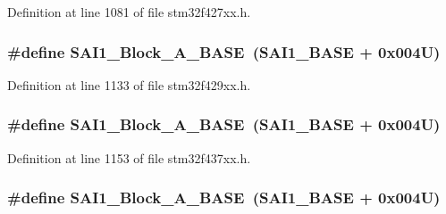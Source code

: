 Definition at line 1081 of file stm32f427xx.\+h.

\subsubsection[{\texorpdfstring{S\+A\+I1\+\_\+\+Block\+\_\+\+A\+\_\+\+B\+A\+SE}{SAI1_Block_A_BASE}}]{\setlength{\rightskip}{0pt plus 5cm}\#define S\+A\+I1\+\_\+\+Block\+\_\+\+A\+\_\+\+B\+A\+SE~({\bf S\+A\+I1\+\_\+\+B\+A\+SE} + 0x004\+U)}\hypertarget{group___peripheral__memory__map_ga31f72e5e5d7aea23bc8a5191bc32e900}{}\label{group___peripheral__memory__map_ga31f72e5e5d7aea23bc8a5191bc32e900}


Definition at line 1133 of file stm32f429xx.\+h.

\subsubsection[{\texorpdfstring{S\+A\+I1\+\_\+\+Block\+\_\+\+A\+\_\+\+B\+A\+SE}{SAI1_Block_A_BASE}}]{\setlength{\rightskip}{0pt plus 5cm}\#define S\+A\+I1\+\_\+\+Block\+\_\+\+A\+\_\+\+B\+A\+SE~({\bf S\+A\+I1\+\_\+\+B\+A\+SE} + 0x004\+U)}\hypertarget{group___peripheral__memory__map_ga31f72e5e5d7aea23bc8a5191bc32e900}{}\label{group___peripheral__memory__map_ga31f72e5e5d7aea23bc8a5191bc32e900}


Definition at line 1153 of file stm32f437xx.\+h.

\subsubsection[{\texorpdfstring{S\+A\+I1\+\_\+\+Block\+\_\+\+A\+\_\+\+B\+A\+SE}{SAI1_Block_A_BASE}}]{\setlength{\rightskip}{0pt plus 5cm}\#define S\+A\+I1\+\_\+\+Block\+\_\+\+A\+\_\+\+B\+A\+SE~({\bf S\+A\+I1\+\_\+\+B\+A\+SE} + 0x004\+U)}\hypertarget{group___peripheral__memory__map_ga31f72e5e5d7aea23bc8a5191bc32e900}{}\label{group___peripheral__memory__map_ga31f72e5e5d7aea23bc8a5191bc32e900}


